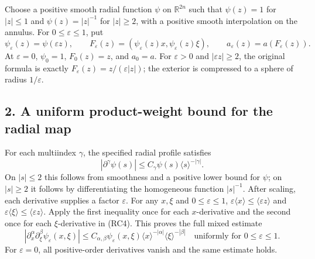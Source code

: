 \documentclass[
  11pt,
]{article}
\begin{document}
Choose a positive smooth radial function \(\psi\) on \(\mathbb R^{2n}\)
such that \(\psi(z)=1\) for \(|z|\le1\) and \(\psi(z)=|z|^{-1}\) for
\(|z|\ge2\), with a positive smooth interpolation on the annulus. For
\(0\le\varepsilon\le1\), put \[
 \psi_\varepsilon(z)=\psi(\varepsilon z),\qquad
 F_\varepsilon(z)=
    (\psi_\varepsilon(z)x,\psi_\varepsilon(z)\xi),\qquad
 a_\varepsilon(z)=a(F_\varepsilon(z)).
 \tag{RC3}
\] At \(\varepsilon=0\), \(\psi_0=1\), \(F_0(z)=z\), and \(a_0=a\). For
\(\varepsilon>0\) and \(|\varepsilon z|\ge2\), the original formula is
exactly \(F_\varepsilon(z)=z/(\varepsilon|z|)\); the exterior is
compressed to a sphere of radius \(1/\varepsilon\).

\subsection{2. A uniform product-weight bound for the radial
map}\label{a-uniform-product-weight-bound-for-the-radial-map}

For each multiindex \(\gamma\), the specified radial profile satisfies
\[
 |\partial^\gamma\psi(s)|
       \le C_\gamma\psi(s)\langle s\rangle^{-|\gamma|}.
 \tag{RC4}
\] On \(|s|\le2\) this follows from smoothness and a positive lower
bound for \(\psi\); on \(|s|\ge2\) it follows by differentiating the
homogeneous function \(|s|^{-1}\). After scaling, each derivative
supplies a factor \(\varepsilon\). For any \(x,\xi\) and
\(0\le\varepsilon\le1\),
\(\varepsilon\langle x\rangle\le\langle\varepsilon z\rangle\) and
\(\varepsilon\langle\xi\rangle\le\langle\varepsilon z\rangle\). Apply
the first inequality once for each \(x\)-derivative and the second once
for each \(\xi\)-derivative in (RC4). This proves the full mixed
estimate \[
 |\partial_x^\alpha\partial_\xi^\beta
          \psi_\varepsilon(x,\xi)|
 \le C_{\alpha,\beta}\psi_\varepsilon(x,\xi)
       \langle x\rangle^{-|\alpha|}
       \langle\xi\rangle^{-|\beta|}
 \quad\text{uniformly for }0\le\varepsilon\le1.
 \tag{RC5}
\] For \(\varepsilon=0\), all positive-order derivatives vanish and the
same estimate holds.
\end{document}
